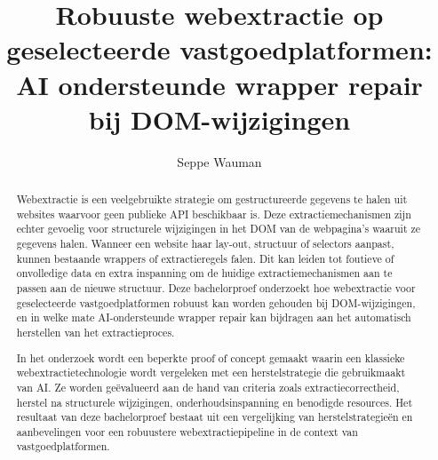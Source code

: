 \documentclass{hogent-article}
\title{Robuuste webextractie op geselecteerde vastgoedplatformen: AI ondersteunde wrapper repair bij DOM-wijzigingen}
\author{Seppe Wauman}
\begin{document}
\begin{abstract}
Webextractie is een veelgebruikte strategie om gestructureerde gegevens te halen uit websites waarvoor geen publieke API beschikbaar is. Deze extractiemechanismen zijn echter gevoelig voor structurele wijzigingen in het DOM van de webpagina’s waaruit ze gegevens halen. Wanneer een website haar lay-out, structuur of selectors aanpast, kunnen bestaande wrappers of extractieregels falen. Dit kan leiden tot foutieve of onvolledige data en extra inspanning om de huidige extractiemechanismen aan te passen aan de nieuwe structuur. Deze bachelorproef onderzoekt hoe webextractie voor geselecteerde vastgoedplatformen robuust kan worden gehouden bij DOM-wijzigingen, en in welke mate AI-ondersteunde wrapper repair kan bijdragen aan het automatisch herstellen van het extractieproces.

In het onderzoek wordt een beperkte proof of concept gemaakt waarin een klassieke webextractietechnologie wordt vergeleken met een herstelstrategie die gebruikmaakt van AI. Ze worden geëvalueerd aan de hand van criteria zoals extractiecorrectheid, herstel na structurele wijzigingen, onderhoudsinspanning en benodigde resources. Het resultaat van deze bachelorproef bestaat uit een vergelijking van herstelstrategieën en aanbevelingen voor een robuustere webextractiepipeline in de context van vastgoedplatformen.
\end{abstract}


\tableofcontents



\printbibliography[heading=bibintoc,title={Referenties}]
\end{document}
